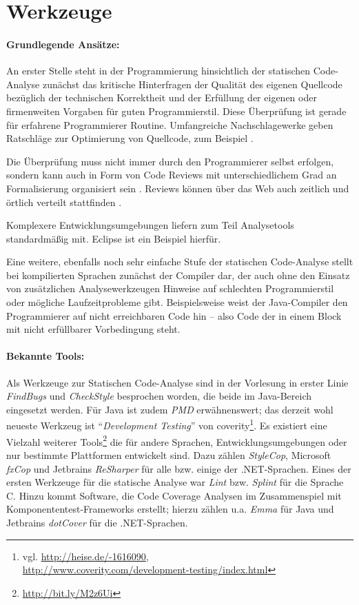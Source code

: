 \section{Werkzeuge}

\paragraph{Grundlegende Ansätze:} An erster Stelle steht in der Programmierung hinsichtlich der statischen Code-Analyse zunächst das kritische Hinterfragen der Qualität des eigenen Quellcode bezüglich der technischen Korrektheit und der  Erfüllung der eigenen oder firmenweiten Vorgaben für guten Programmierstil. Diese Überprüfung ist gerade für erfahrene Programmierer Routine. Umfangreiche Nachschlagewerke geben Ratschläge zur Optimierung von Quellcode, zum Beispiel \cite{mcconnell2004}.

Die Überprüfung muss nicht immer durch den Programmierer selbst erfolgen, sondern kann auch in Form von Code Reviews mit unterschiedlichem Grad an Formalisierung organisiert sein \citep{spillner2011}. Reviews können über das Web auch zeitlich und örtlich verteilt stattfinden \citep{codereviews:meyer}.

Komplexere Entwicklungsumgebungen liefern zum Teil Analysetools standardmäßig mit. Eclipse ist ein Beispiel hierfür.

Eine weitere, ebenfalls noch sehr einfache Stufe der statischen Code-Analyse stellt bei kompilierten Sprachen zunächst der Compiler dar, der auch ohne den Einsatz von zusätzlichen Analysewerkzeugen Hinweise auf schlechten Programmierstil oder mögliche Laufzeitprobleme gibt. Beispielsweise weist der Java-Compiler den Programmierer auf nicht erreichbaren Code hin -- also Code der in einem Block mit nicht erfüllbarer Vorbedingung steht.

\paragraph{Bekannte Tools:} Als Werkzeuge zur Statischen Code-Analyse sind in der Vorlesung in erster Linie \textit{FindBugs} und \textit{CheckStyle} besprochen worden, die beide im Java-Bereich eingesetzt werden. Für Java ist zudem \textit{PMD} erwähnenswert; das derzeit wohl neueste Werkzeug ist ``\textit{Development Testing}'' von coverity\footnote{vgl. \url{http://heise.de/-1616090}, \\\url{http://www.coverity.com/development-testing/index.html}}. Es existiert eine Vielzahl weiterer Tools\footnote{\url{http://bit.ly/M2z6Ui}} die für andere Sprachen, Entwicklungsumgebungen oder nur bestimmte Plattformen entwickelt sind. Dazu zählen \textit{StyleCop}, Microsoft \textit{fxCop} und Jetbrains \textit{ReSharper} für alle bzw. einige der .NET-Sprachen. Eines der ersten Werkzeuge für die statische Analyse war \textit{Lint} bzw. \textit{Splint} für die Sprache C. Hinzu kommt Software, die  Code Coverage Analysen im Zusammenspiel mit Komponententest-Frameworks erstellt; hierzu zählen u.a. \textit{Emma} für Java und Jetbrains \textit{dotCover} für die .NET-Sprachen.

